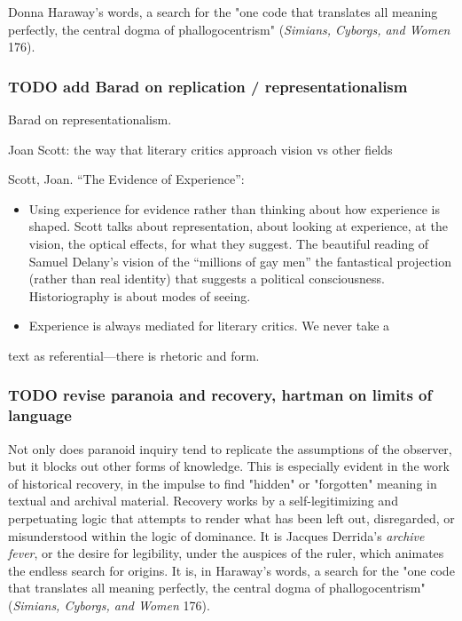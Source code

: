 \documentclass[11pt]{article}
\begin{document}
Donna Haraway's words, a search for the "one code that translates all
meaning perfectly, the central dogma of phallogocentrism" (\emph{Simians,
Cyborgs, and Women} 176).

\subsubsection{{\bfseries\sffamily TODO} add Barad on replication / representationalism}
\label{sec:org3ceb61a}

Barad on representationalism. 

Joan Scott: the way that literary critics approach vision vs other
fields

Scott, Joan. “The Evidence of Experience”:
\begin{itemize}
\item Using experience for evidence rather than thinking about how
experience is shaped. Scott talks about representation, about
looking at experience, at the vision, the optical effects, for what
they suggest. The beautiful reading of Samuel Delany’s vision of the
“millions of gay men” the fantastical projection (rather than real
identity) that suggests a political consciousness. Historiography is
about modes of seeing.
\item Experience is always mediated for literary critics. We never take a
\end{itemize}
text as referential---there is rhetoric and form.

\subsubsection{{\bfseries\sffamily TODO} revise paranoia and recovery, hartman on limits of language}
\label{sec:org6381f8d}

Not only does paranoid inquiry tend to replicate the assumptions of
the observer, but it blocks out other forms of knowledge. This is
especially evident in the work of historical recovery, in the impulse
to find "hidden" or "forgotten" meaning in textual and archival
material. Recovery works by a self-legitimizing and perpetuating logic
that attempts to render what has been left out, disregarded, or
misunderstood within the logic of dominance. It is Jacques Derrida's
\emph{archive fever}, or the desire for legibility, under the auspices of
the ruler, which animates the endless search for origins. It is, in
Haraway's words, a search for the "one code that translates all
meaning perfectly, the central dogma of phallogocentrism" (\emph{Simians,
Cyborgs, and Women} 176).
\end{document}

